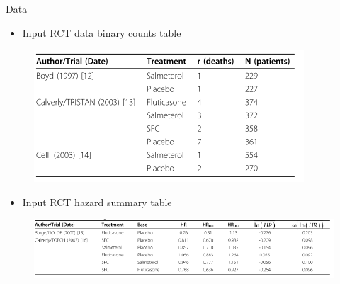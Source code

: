 \documentclass[
  ignorenonframetext,
]{beamer}
\providecommand{\tightlist}{%
  \setlength{\itemsep}{0pt}\setlength{\parskip}{0pt}}\usepackage{longtable,booktabs,array}
\begin{document}
\begin{frame}{Data}
\protect\hypertarget{data-1}{}
\begin{itemize}
\tightlist
\item
  Input RCT data binary counts table
\end{itemize}

\begin{figure}

{\centering \includegraphics{woods-count-table.png}

}

\end{figure}

\begin{itemize}
\tightlist
\item
  Input RCT hazard summary table
\end{itemize}

\begin{figure}

{\centering \includegraphics{woods-hr-table.png}

}

\end{figure}
\end{frame}
\end{document}
